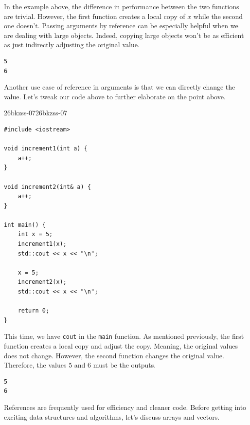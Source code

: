\documentclass[../../../main.tex]{subfiles}
\begin{document}
In the example above, the difference in performance between the
two functions are trivial. However, the first function creates
a local copy of $x$ while the second one doesn't. Passing arguments
by reference can be especially helpful when we are dealing with
large objects. Indeed, copying large objects won't be as efficient
as just indirectly adjusting the original value.

\begin{outputbox}
\begin{lstlisting}[style=basic]
5
6
\end{lstlisting}
\end{outputbox}

Another use case of reference in arguments is that we can directly
change the value. Let's tweak our code above to further elaborate
on the point above.

\begin{cppbox}{26bkzss-07}{26bkzss-07}
\begin{lstlisting}[style=cppstyle]
#include <iostream>

void increment1(int a) {
    a++;
}

void increment2(int& a) {
    a++;
}

int main() {
    int x = 5;
    increment1(x);
    std::cout << x << "\n";

    x = 5;
    increment2(x);
    std::cout << x << "\n";

    return 0;
}
\end{lstlisting}
\end{cppbox}

This time, we have \verb|cout| in the \verb|main| function. As
mentioned previously, the first function creates a local copy and
adjust the copy. Meaning, the original values does not change.
However, the second function changes the original value. Therefore,
the values $5$ and $6$ must be the outputs.

\begin{outputbox}
\begin{lstlisting}[style=basic]
5
6
\end{lstlisting}
\end{outputbox}

References are frequently used for efficiency and cleaner code.
Before getting into exciting data structures and algorithms,
let's discuss arrays and vectors.
\end{document}
